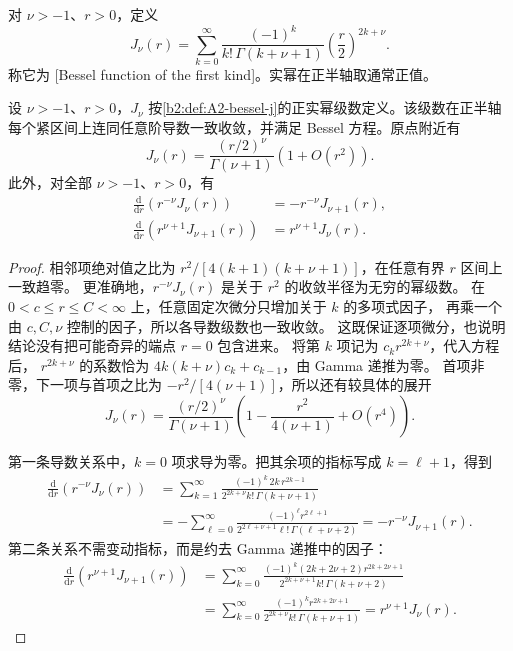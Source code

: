 \begin{definition}
\label{b2:def:A2-bessel-j}
对 \(\nu>-1\)、\(r>0\)，定义
\[
 J_\nu(r)=\sum_{k=0}^\infty
 \frac{(-1)^k}{k!\,\Gamma(k+\nu+1)}\left(\frac r2\right)^{2k+\nu}.
\]
称它为 [Bessel function of the first kind]。实幂在正半轴取通常正值。
\end{definition}

\begin{proposition}[级数与微分关系]
\label{b2:prop:A2-bessel-series}
设 \(\nu>-1\)、\(r>0\)，\(J_\nu\) 按\cref{b2:def:A2-bessel-j}的正实幂级数定义。该级数在正半轴每个紧区间上连同任意阶导数一致收敛，并满足 Bessel 方程。原点附近有
\[J_\nu(r)=\frac{(r/2)^\nu}{\Gamma(\nu+1)}(1+O(r^2)).\]
此外，对全部 \(\nu>-1\)、\(r>0\)，有
\[
 \begin{aligned}
 \frac{\mathrm d}{\mathrm dr}(r^{-\nu}J_\nu(r))
 &=-r^{-\nu}J_{\nu+1}(r),\\
 \frac{\mathrm d}{\mathrm dr}(r^{\nu+1}J_{\nu+1}(r))
 &=r^{\nu+1}J_\nu(r).
 \end{aligned}
\]
\end{proposition}
\begin{proof}
相邻项绝对值之比为
\(r^2/[4(k+1)(k+\nu+1)]\)，在任意有界 \(r\) 区间上一致趋零。
更准确地，\(r^{-\nu}J_\nu(r)\) 是关于 \(r^2\) 的收敛半径为无穷的幂级数。
在 \(0<c\leq r\leq C<\infty\) 上，任意固定次微分只增加关于 \(k\) 的多项式因子，
再乘一个由 \(c,C,\nu\) 控制的因子，所以各导数级数也一致收敛。
这既保证逐项微分，也说明结论没有把可能奇异的端点 \(r=0\) 包含进来。
将第 \(k\) 项记为 \(c_kr^{2k+\nu}\)，代入方程后，
\(r^{2k+\nu}\) 的系数恰为
\(4k(k+\nu)c_k+c_{k-1}\)，由 Gamma 递推为零。
首项非零，下一项与首项之比为 \(-r^2/[4(\nu+1)]\)，所以还有较具体的展开
\[
 J_\nu(r)=\frac{(r/2)^\nu}{\Gamma(\nu+1)}
 \left(1-\frac{r^2}{4(\nu+1)}+O(r^4)\right).
\]

第一条导数关系中，\(k=0\) 项求导为零。把其余项的指标写成 \(k=\ell+1\)，得到
\[
 \begin{aligned}
 \frac{\mathrm d}{\mathrm dr}(r^{-\nu}J_\nu(r))
 &=\sum_{k=1}^\infty
 \frac{(-1)^k\,2k\,r^{2k-1}}
 {2^{2k+\nu}k!\,\Gamma(k+\nu+1)}\\
 &=-\sum_{\ell=0}^\infty
 \frac{(-1)^\ell r^{2\ell+1}}
 {2^{2\ell+\nu+1}\ell!\,\Gamma(\ell+\nu+2)}
 =-r^{-\nu}J_{\nu+1}(r).
 \end{aligned}
\]
第二条关系不需变动指标，而是约去 Gamma 递推中的因子：
\[
 \begin{aligned}
 \frac{\mathrm d}{\mathrm dr}(r^{\nu+1}J_{\nu+1}(r))
 &=\sum_{k=0}^\infty
 \frac{(-1)^k(2k+2\nu+2)r^{2k+2\nu+1}}
 {2^{2k+\nu+1}k!\,\Gamma(k+\nu+2)}\\
 &=\sum_{k=0}^\infty
 \frac{(-1)^kr^{2k+2\nu+1}}
 {2^{2k+\nu}k!\,\Gamma(k+\nu+1)}
 =r^{\nu+1}J_\nu(r).
 \end{aligned}
\]
\end{proof}

